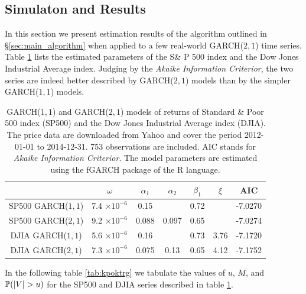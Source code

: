 \subsection{Simulaton and Results}
In this section we present estimation results of the algorithm
outlined in \S\ref{sec:main_algorithm} when applied to a few
real-world GARCH($2,1$) time series. Table \ref{tab:tgjuy} lists the
estimated parameters of the S\& P 500 index and the Dow Jones
Industrial Average index. Judging by the {\em Akaike Information
  Criterior}, the two series are indeed better described by GARCH($2,
1$) models than by the simpler GARCH($1,1$) models.
\begin{table}[htb!]
  \centering
  \begin{tabular}{|c|c|c|c|c|c|c|}
    \hline \hline
    & $\omega$ & $\alpha_1$ & $\alpha_2$ & $\beta_1$ & $\xi$ & AIC\\
    \hline
    SP500 GARCH($1, 1$) & 7.4 $\times 10^{-6}$ & 0.15 &  & 0.72 &  &
    -7.0270 \\ 
    SP500 GARCH($2, 1$) & 9.2 $\times 10^{-6}$ & 0.088 & 0.097 & 0.65
    &  & -7.0274 \\ 
    DJIA GARCH($1, 1$) & 5.6 $\times 10^{-6}$ & 0.16 &  & 0.73 & 3.76
    & -7.1720\\ 
    DJIA GARCH($2, 1$) & 7.3 $\times 10^{-6}$ & 0.075 & 0.13 & 0.65 &
    4.12 & -7.1752 \\
    \hline
  \end{tabular}
  \caption{GARCH($1,1$) and GARCH($2,1$) models of returns of Standard
    \& Poor 500 index (SP500) and the Dow Jones Industrial Average
    index (DJIA). The price data are downloaded from Yahoo and cover
    the period 2012-01-01 to 2014-12-31. 753 observations are
    included. AIC stands for {\em Akaike Information Criterior}. The
    model parameters are estimated using the fGARCH package
    \cite{fGarch:2016} of the R language.
  }
  \label{tab:tgjuy}
\end{table}
In the following table \ref{tab:kpoktrg} we tabulate the values of
$u$, $M$, and $\P(|V| > u)$ for the SP500 and DJIA series described in
table \ref{tab:tgjuy}.
